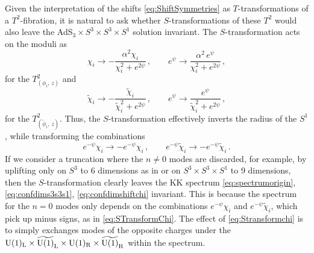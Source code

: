 \documentclass[a4paper, 11pt]{article}
\numberwithin{equation}{section}
\newcommand{\ts}[1]{\widetilde{#1}}
\newcommand{\+}{\oplus}
\begin{document}
Given the interpretation of the shifts \eqref{eq:ShiftSymmetries} as $T$-transformations of a $T^2$-fibration, it is natural to ask whether $S$-transformations of these $T^2$ would also leave the AdS$_3 \times S^3 \times S^3 \times S^1$ solution invariant. The $S$-transformation acts on the moduli as
\begin{equation} \label{eq:Stransformchi}
	\chi_i \rightarrow - \frac{\alpha^2 \chi_i}{\chi_i^2+e^{2\psi}} \,, \qquad e^{\psi} \rightarrow \frac{\alpha^2\, e^{\psi}}{\chi_i^2+e^{2\psi}} \,,
\end{equation}
for the $T^2_{(\phi_i,\, z)}$ and
\begin{equation} \label{eq:Stransformchitilde}
	\ts{\chi}_i \rightarrow - \frac{\ts{\chi}_i}{\ts{\chi}_i^2+e^{2\psi}} \,, \qquad e^{\psi} \rightarrow \frac{e^{\psi}}{\ts{\chi}_i^2+e^{2\psi}} \,,
\end{equation}
for the $T^2_{(\ts{\phi}_i,\, z)}$. Thus, the $S$-transformation effectively inverts the radius of the $S^1$, while transforming the combinations
\begin{equation} \label{eq:STransformChi}
	e^{-\psi}\chi_i \rightarrow - e^{-\psi}\chi_i \,, \qquad e^{-\psi} \ts{\chi}_i \rightarrow - e^{-\psi}\ts{\chi}_i \,.
\end{equation}
If we consider a truncation where the $n \neq 0$ modes are discarded, for example, by uplifting only on $S^3$ to 6 dimensions as in \cite{Eloy:2021fhc} or on $S^3 \times S^3 \times S^1$ to 9 dimensions, then the $S$-transformation clearly leaves the KK spectrum \eqref{eq:spectrumorigin}, \eqref{eq:confdims3s3s1}, \eqref{eq:confdimshiftchi} invariant. This is because the spectrum for the $n = 0$ modes only depends on the combinations $e^{-\psi}\chi_i$ and $e^{-\psi}\ts{\chi}_i$, which pick up minus signs, as in \eqref{eq:STransformChi}. The effect of \eqref{eq:Stransformchi} is to simply exchanges modes of the opposite charges under the ${\rm U}(1)_{\rm L}\times\ts{{\rm U}(1)}_{\rm L}\times{\rm U}(1)_{\rm R}\times\ts{{\rm U}(1)}_{\rm R}$ within the spectrum.
\end{document}
